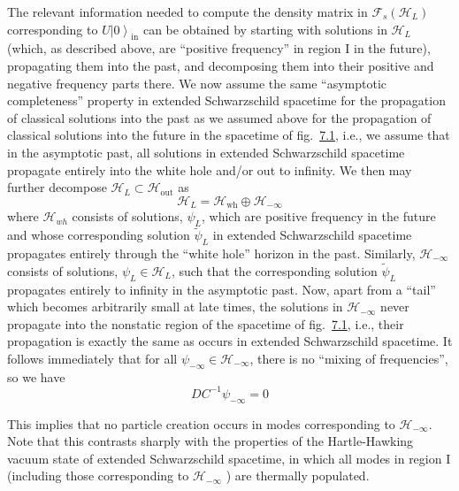 \documentclass[11pt,a4paper]{article}
\providecommand{\ket}[1]{\left\lvert#1\right\rangle}
\begin{document}
The relevant information needed to compute the density matrix in \(\mathcal{F}_s(\mathcal{H}_L)\) corresponding to \(U\ket0_{\mathrm{in}}\) can be obtained by starting with solutions in \(\mathcal{H}_L\) (which, as described above, are ``positive frequency'' in region I in the future), propagating them into the past, and decomposing them into their positive and negative frequency parts there. We now assume the same ``asymptotic completeness'' property in extended Schwarzschild spacetime for the propagation of classical solutions into the past as we assumed above for the propagation of \hypertarget{source-168}{} classical solutions into the future in the spacetime of fig.~\hyperref[fig:7.1]{7.1}, i.e., we assume that in the asymptotic past, all solutions in extended Schwarzschild spacetime propagate entirely into the white hole and/or out to infinity. We then may further decompose \(\mathcal{H}_L \subset \mathcal{H}_{\mathrm{out}}\) as
\begin{equation*}
\mathcal{H}_{L} = \mathcal{H}_{\mathrm{wh}} \oplus \mathcal{H}_{-\infty} \tag{7.1.1}\label{eq:7.1.1}
\end{equation*}
where \(\mathcal{H}_{wh}\) consists of solutions, \(\psi_L\), which are positive frequency in the future and whose corresponding solution \(\widetilde{\psi}_L\) in extended Schwarzschild spacetime propagates entirely through the ``white hole'' horizon in the past. Similarly, \(\mathcal{H}_{-\infty}\) consists of solutions, \(\psi_L \in \mathcal{H}_L\), such that the corresponding solution \(\widetilde{\psi}_L\) propagates entirely to infinity in the asymptotic past. Now, apart from a ``tail'' which becomes arbitrarily small at late times, the solutions in \(\mathcal{H}_{-\infty}\) never propagate into the nonstatic region of the spacetime of fig.~\hyperref[fig:7.1]{7.1}, i.e., their propagation is exactly the same as occurs in extended Schwarzschild spacetime. It follows immediately that for all \(\psi_{-\infty} \in \mathcal{H}_{-\infty}\), there is no ``mixing of frequencies'', so we have
\begin{equation*}
DC^{-1}\psi_{-\infty} = 0 \tag{7.1.2}\label{eq:7.1.2}
\end{equation*}

This implies that no particle creation occurs in modes corresponding to \(\mathcal{H}_{-\infty}\). Note that this contrasts sharply with the properties of the Hartle-Hawking vacuum state of extended Schwarzschild spacetime, in which all modes in region I (including those corresponding to \(\mathcal{H}_{-\infty}\) ) are thermally populated.
\end{document}
